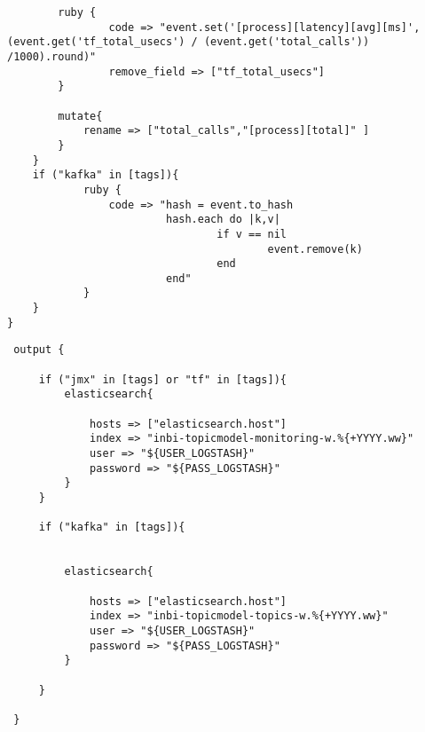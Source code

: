 \begin{verbatim}
        ruby {
                code => "event.set('[process][latency][avg][ms]', (event.get('tf_total_usecs') / (event.get('total_calls')) /1000).round)"
                remove_field => ["tf_total_usecs"]
        }
    
        mutate{
            rename => ["total_calls","[process][total]" ] 
        }
    }
    if ("kafka" in [tags]){        
            ruby {
                code => "hash = event.to_hash
                         hash.each do |k,v|
                                 if v == nil
                                         event.remove(k)
                                 end
                         end"
            }
    }
}
\end{verbatim}



\begin{verbatim}
 output {
 
     if ("jmx" in [tags] or "tf" in [tags]){
         elasticsearch{
         
             hosts => ["elasticsearch.host"]
             index => "inbi-topicmodel-monitoring-w.%{+YYYY.ww}"
             user => "${USER_LOGSTASH}"
             password => "${PASS_LOGSTASH}"
         }
     }
 
     if ("kafka" in [tags]){
     
         
         elasticsearch{
         
             hosts => ["elasticsearch.host"]
             index => "inbi-topicmodel-topics-w.%{+YYYY.ww}"
             user => "${USER_LOGSTASH}"
             password => "${PASS_LOGSTASH}"
         }
         
     }
     
 }	
 	
\end{verbatim}



